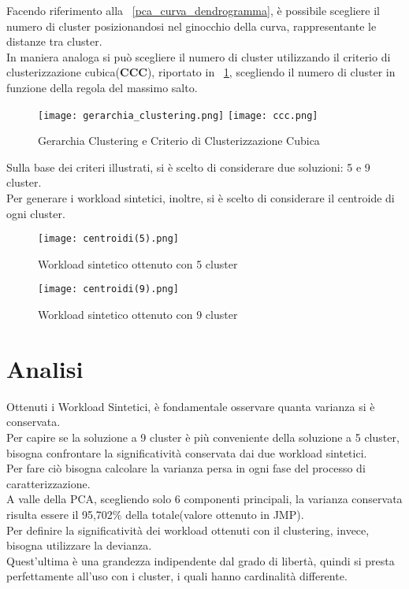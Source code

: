 Facendo riferimento alla \figurename~\ref{pca_curva_dendrogramma}, è possibile scegliere
il numero di cluster posizionandosi nel ginocchio della curva, rappresentante le
distanze tra cluster.\\
In maniera analoga si può scegliere il numero di cluster utilizzando il criterio
di clusterizzazione cubica(\textbf{CCC}), riportato in \figurename~\ref{pca_ccc},
scegliendo il numero di cluster in funzione della regola del massimo salto.\\

\begin{figure}[htbp]
\centering
\texttt{[image: gerarchia\_clustering.png]}%
\qquad\qquad
\texttt{[image: ccc.png]}
\caption{Gerarchia Clustering e Criterio di Clusterizzazione Cubica}
\label{pca_ccc}
\end{figure}

\clearpage

Sulla base dei criteri illustrati, si è scelto di considerare due soluzioni:
5 e 9 cluster.\\
Per generare i workload sintetici, inoltre, si è scelto di considerare il
centroide di ogni cluster.\\

\begin{figure}[!htbp]
	\texttt{[image: centroidi(5).png]}
  \caption{Workload sintetico ottenuto con 5 cluster}
  \label{}
\end{figure}

\begin{figure}[!htbp]
	\texttt{[image: centroidi(9).png]}
  \caption{Workload sintetico ottenuto con 9 cluster}
  \label{pca_centroidi9}
\end{figure}

\clearpage
\section{Analisi}
Ottenuti i Workload Sintetici, è fondamentale osservare quanta varianza si è
conservata.\\
Per capire se la soluzione a 9 cluster è più conveniente della soluzione
a 5 cluster, bisogna confrontare la significatività conservata dai due workload sintetici.\\
Per fare ciò bisogna calcolare la varianza persa in ogni fase del processo di
caratterizzazione.\\
A valle della PCA, scegliendo solo 6 componenti principali, la varianza conservata
 risulta essere il 95,702\% della totale(valore ottenuto in JMP).\\
Per definire la significatività dei workload ottenuti con il clustering, invece, bisogna
utilizzare la devianza.\\
Quest'ultima è una grandezza indipendente dal grado di libertà, quindi si presta
perfettamente all'uso con i cluster, i quali hanno cardinalità differente.\\

